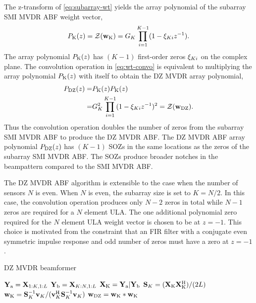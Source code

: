  The z-transform of \eqref{eq:subarray-wt} yields the array polynomial of
 the subarray SMI MVDR ABF weight vector,
\begin{equation}
  \label{eq:subarray-poly}
  {P}_{{\rm K}}(z) = \mathcal{Z}{({\bf w}_{\rm K})} = G_K\prod_{i=1}^{K - 1}( 1 -
  \xi_{Ki} z^{-1}).
\end{equation}
The array polynomial ${P}_{{\rm K}}(z)$ has $(K - 1)$ first-order
zeros $\xi_{Ki}$ on the complex plane. The convolution operation in
\eqref{eq:wt-convo} is equivalent to multiplying the array polynomial
${P}_{{\rm K}}(z)$ with itself to obtain the DZ MVDR array polynomial,
\begin{align*}
{P}_{{\rm DZ}}(z) =& {P}_{{\rm K}}(z){P}_{{\rm K}}(z) \\
                     =& G_K^2\prod\limits_{i=1}^{K - 1}( 1 -
                        \xi_{Ki} z^{-1})^2  = \mathcal{Z}{({\bf w}_{\rm DZ})}.
\end{align*}
Thus the convolution operation doubles the number of zeros from the
subarray SMI MVDR ABF to produce the DZ MVDR ABF. The DZ MVDR ABF
array polynomial ${P}_{{\rm DZ}}(z)$ has $(K - 1)$ SOZs in the same
locations as the zeros of the subarray SMI MVDR ABF. The SOZs produce
broader notches in the beampattern compared to the SMI MVDR ABF.

The DZ MVDR ABF algorithm is extensible to the case when the number of
sensors $N$ is even. When $N$ is even, the subarray size is set to
$K = N/2$. In this case, the convolution operation produces only
$N - 2$ zeros in total while $N - 1$ zeros are required for a $N$
element ULA. The one additional polynomial zero required for the $N$
element ULA weight vector is chosen to be at $z = -1$. This choice is
motivated from the constraint that an FIR filter with a conjugate even
symmetric impulse response and odd number of zeros must have a zero at
$z = -1$ \cite[Sec.~5.7.3]{Oppenheim1989}.


\begin{algorithm}
  \caption{DZ MVDR beamformer} \label{alg:dzmvdr}
  \begin{algorithmic}
     \State $\mathbf{Y}_{{\rm a}} = \mathbf{X}_{1:K,1:L}$
     \State $\mathbf{Y}_{{\rm b}} = \mathbf{X}_{K:N,1:L}$
     \State $\mathbf{X}_{\rm K} = \mathbf{Y}_{{\rm a}} | \mathbf{Y}_{{\rm b}}$
    \EndProcedure
    \State ${\bf S}_{K} = (\mathbf{X}_{\rm K} \mathbf{X}_{\rm K}^{\rm H})/(2L)$
    \State  ${\bf w}_{\rm K} = {\bf S}_{K}^{-1}{\bf v}_{K}/({\bf v}_{K}^{\rm H} {\bf S}_{K}^{-1}{\bf v}_{K})$
    \EndProcedure
    \State ${\bf w}_{\rm DZ} = {\bf w}_{\rm K}*{\bf w}_{\rm K}$
    \EndProcedure
  \end{algorithmic}
\end{algorithm}


